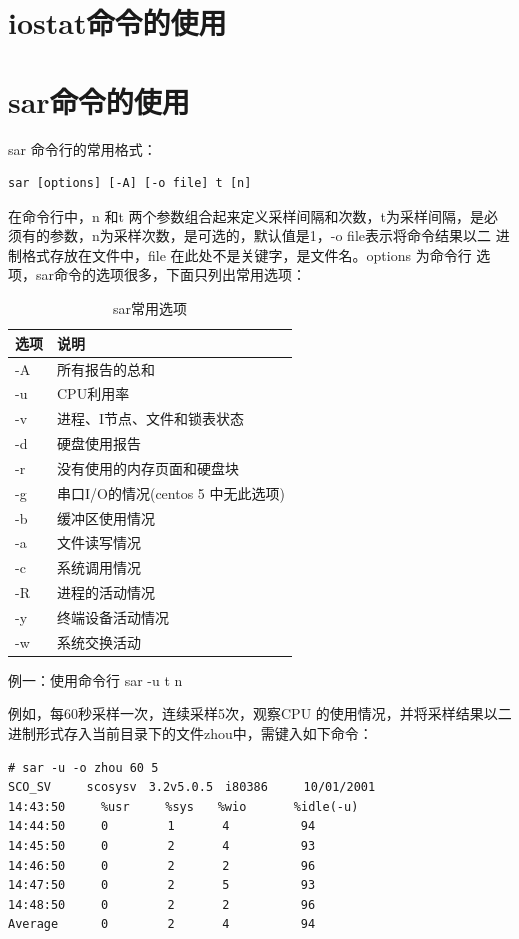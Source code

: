\section{iostat命令的使用}
\label{sec:iostatCmd}

\section{sar命令的使用}
\label{sec:sarCmd}

sar 命令行的常用格式：
\begin{verbatim}
sar [options] [-A] [-o file] t [n]
\end{verbatim}

在命令行中，n 和t 两个参数组合起来定义采样间隔和次数，t为采样间隔，是必
须有的参数，n为采样次数，是可选的，默认值是1，-o file表示将命令结果以二
进制格式存放在文件中，file 在此处不是关键字，是文件名。options 为命令行
选项，sar命令的选项很多，下面只列出常用选项：

\begin{table}[!h]
  \centering
  \begin{tabular}{ll}
    \toprule
    选项     & 说明 \\
    \midrule
    -A  & 所有报告的总和 \\
    -u  & CPU利用率 \\
    -v  & 进程、I节点、文件和锁表状态 \\
    -d  & 硬盘使用报告 \\
    -r  & 没有使用的内存页面和硬盘块 \\
    -g  & 串口I/O的情况(centos 5 中无此选项) \\
    -b  & 缓冲区使用情况 \\
    -a  & 文件读写情况 \\
    -c  & 系统调用情况 \\
    -R  & 进程的活动情况 \\
    -y  & 终端设备活动情况 \\
    -w  & 系统交换活动 \\
    \bottomrule
  \end{tabular}
  \caption{sar常用选项}
  \label{tab:sarOptions}
\end{table}

例一：使用命令行 sar -u t n

例如，每60秒采样一次，连续采样5次，观察CPU 的使用情况，并将采样结果以二
进制形式存入当前目录下的文件zhou中，需键入如下命令：

\begin{verbatim}
# sar -u -o zhou 60 5
SCO_SV　　　scosysv　3.2v5.0.5　i80386　　　10/01/2001
14:43:50　　　%usr　　　%sys　　%wio　　　　%idle(-u)
14:44:50　　　0　　　　　1　　　　4　　　　　　94
14:45:50　　　0　　　　　2　　　　4　　　　　　93
14:46:50　　　0　　　　　2　　　　2　　　　　　96
14:47:50　　　0　　　　　2　　　　5　　　　　　93
14:48:50　　　0　　　　　2　　　　2　　　　　　96
Average　　　 0　　　　　2　　　　4　　　　　　94
\end{verbatim}

